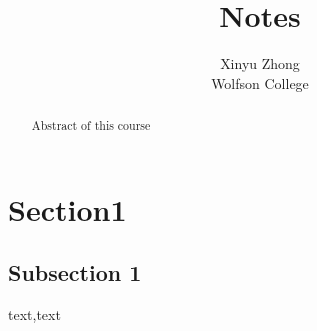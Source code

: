 \documentclass[12pt,a4paper]{article}
\author{Xinyu Zhong\\Wolfson College}
\title{Notes}
\begin{document}
\begin{titlepage}
    \maketitle
\end{titlepage}

\tableofcontents

\begin{abstract}
\noindent
Abstract of this course
\end{abstract}


\section{Section1}
    \subsection{Subsection 1}
    text,text
\end{document}
